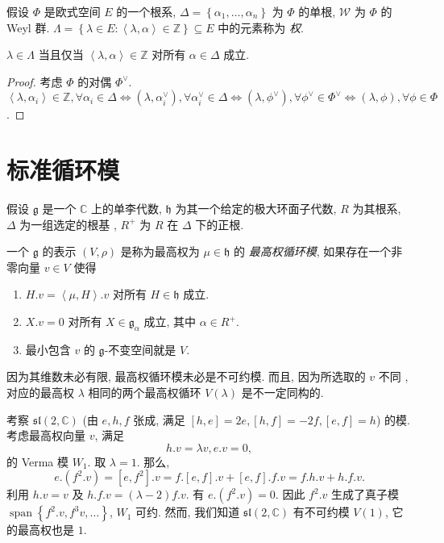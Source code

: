 假设 \( \Phi \) 是欧式空间 \( E \) 的一个根系, \( \Delta = \left\lbrace
\alpha_1, \ldots, \alpha_n \right\rbrace \) 为 \( \Phi \)
的单根, \( \mathscr{W} \) 为 \( \Phi \) 的 Weyl 群. \( \Lambda = \left\lbrace
\lambda \in E: \left\langle \lambda, \alpha \right\rangle \in \mathbb{Z}
\right\rbrace \subseteq E \) 中的元素称为 \emph{权}.

\begin{proposition}
  \( \lambda \in \Lambda \) 当且仅当 \( \left\langle \lambda, \alpha
  \right\rangle \in \mathbb{Z} \) 对所有 \( \alpha \in \Delta \) 成立.
\end{proposition}
\begin{proof}
  考虑 \( \Phi \) 的对偶 \( \Phi^{\vee} \). \( \left\langle \lambda, \alpha_i
  \right\rangle \in \mathbb{Z}, \forall \alpha_i \in \Delta \iff \left( \lambda,
  \alpha_i^{\vee} \right),\forall \alpha_i^{\vee} \in \Delta \iff \left(
\lambda, \phi^{\vee} \right),\forall \phi^{\vee} \in \Phi^{\vee} \iff \left(
\lambda, \phi \right), \forall \phi \in \Phi \).
\end{proof}

\section{标准循环模}

假设 \( \mathfrak{g} \) 是一个 \( \mathbb{C} \) 上的单李代数, \( \mathfrak{h} \)
为其一个给定的极大环面子代数, \( R \) 为其根系, \( \Delta \) 为一组选定的根基 ,
\( R^+ \) 为 \( R \) 在 \( \Delta \) 下的正根.

一个 \( \mathfrak{g} \) 的表示 \( (V, \rho) \) 是称为最高权为 \( \mu \in
\mathfrak{h} \) 的 \emph{最高权循环模}, 如果存在一个非零向量 \( v \in V \) 使得
\begin{enumerate}
  \item \( H.v = \left\langle \mu, H \right\rangle.v \) 对所有 \( H \in
    \mathfrak{h} \) 成立.
  \item \( X.v = 0 \) 对所有 \( X \in \mathfrak{g}_{\alpha} \) 成立, 其中 \(
    \alpha \in R^+ \).
  \item 最小包含 \( v \) 的 \( \mathfrak{g} \)-不变空间就是 \( V \).
\end{enumerate}

因为其维数未必有限, 最高权循环模未必是不可约模. 而且, 因为所选取的 \( v \) 不同
, 对应的最高权 \( \lambda \) 相同的两个最高权循环 \( V(\lambda) \)
是不一定同构的.
\begin{example}
  考察 \( \mathfrak{sl}(2, \mathbb{C}) \) (由 \( e, h, f \) 张成, 满足 \( [h,
  e]= 2e, [h, f] = -2f, [e, f] = h \)) 的模.
  考虑最高权向量 \( v \), 满足
  \[
    h.v = \lambda v, e.v = 0,
  \]
  的 Verma 模 \( W_1 \). 取 \( \lambda = 1 \). 那么,
  \[
    e.(f^2.v) = [e, f^2].v = f.[e, f].v + [e, f].f.v = f.h.v + h.f.v.
  \]
  利用 \( h.v = v \) 及 \( h.f.v = (\lambda - 2)f.v \). 有
  \( e.(f^2.v) = 0 \). 因此 \( f^2.v \) 生成了真子模 \( \operatorname{span}
  \left\lbrace f^2.v, f^3v,\ldots \right\rbrace \), \( W_1 \) 可约.
  然而, 我们知道 \( \mathfrak{sl}(2, \mathbb{C}) \) 有不可约模 \( V(1) \),
  它的最高权也是 \( 1 \).
\end{example}

